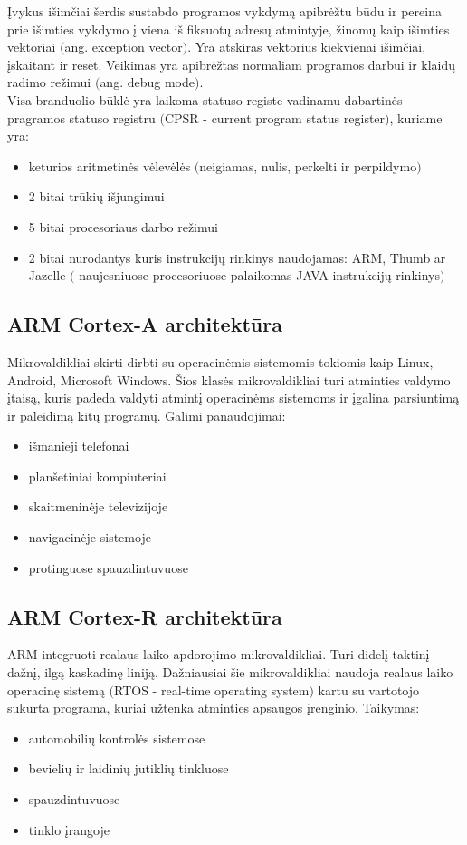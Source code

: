 \documentclass[a4paper, 12pt]{article} %
\begin{document}
\begin{onehalfspacing}
\indent \k{I}vykus i\v{s}im\v{c}iai \v{s}erdis sustabdo programos vykdym\k{a} apibr\.{e}\v{z}tu b\={u}du ir pereina prie i\v{s}imties vykdymo \k{i} viena i\v{s} fiksuot\k{u} adres\k{u} atmintyje, \v{z}inom\k{u} kaip i\v{s}imties vektoriai $($ang. exception vector$)$. Yra atskiras vektorius kiekvienai i\v{s}im\v{c}iai, \k{i}skaitant ir reset. Veikimas yra apibr\.{e}\v{z}tas normaliam programos darbui ir klaid\k{u} radimo re\v{z}imui $($ang. debug mode$)$.  \\
\indent Visa branduolio b\={u}kl\.{e} yra laikoma statuso registe vadinamu dabartin\.{e}s pragramos statuso registru $($CPSR - current program status register$)$, kuriame yra:
\begin{itemize}
\item keturios aritmetin\.{e}s v\.{e}lev\.{e}l\.{e}s $($neigiamas, nulis, perkelti ir perpildymo$)$
\item 2 bitai tr\={u}ki\k{u} i\v{s}jungimui
\item 5 bitai procesoriaus darbo re\v{z}imui
\item 2 bitai nurodantys kuris instrukcij\k{u} rinkinys naudojamas: ARM, Thumb ar Jazelle  $($ naujesniuose procesoriuose palaikomas JAVA instrukcij\k{u} rinkinys$)$
\end{itemize}
\subsection{ARM Cortex-A architekt\={u}ra}
Mikrovaldikliai skirti dirbti su operacin\.{e}mis sistemomis tokiomis kaip Linux, Android, Microsoft Windows. \v{S}ios klas\.{e}s mikrovaldikliai turi atminties valdymo \k{i}tais\k{a}, kuris padeda valdyti atmint\k{i} operacin\.{e}ms sistemoms ir \k{i}galina parsiuntim\k{a} ir paleidim\k{a} kit\k{u} program\k{u}. Galimi panaudojimai:
\begin{itemize}
\item i\v{s}manieji telefonai
\item plan\v{s}etiniai kompiuteriai
\item skaitmenin\.{e}je televizijoje
\item navigacin\.{e}je sistemoje
\item protinguose spauzdintuvuose
\end{itemize}

\subsection{ARM Cortex-R architekt\={u}ra}
ARM integruoti realaus laiko apdorojimo mikrovaldikliai. Turi didel\k{i} taktin\k{i} da\v{z}n\k{i}, ilg\k{a} kaskadin\k{e} linij\k{a}. Da\v{z}niausiai \v{s}ie mikrovaldikliai naudoja realaus laiko operacin\k{e} sistem\k{a} $($RTOS - real-time operating system$)$ kartu su vartotojo sukurta programa, kuriai u\v{z}tenka atminties apsaugos \k{i}renginio. Taikymas:
\begin{itemize}
\item automobili\k{u} kontrol\.{e}s sistemose
\item bevieli\k{u} ir laidini\k{u} jutikli\k{u} tinkluose
\item spauzdintuvuose
\item tinklo \k{i}rangoje
\end{itemize}

\end{onehalfspacing}
\end{document}

